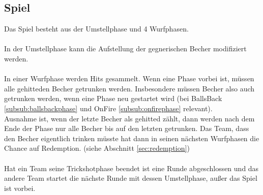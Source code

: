 \documentclass[a5paper, 12pt]{book}
\begin{document}
\subsection{Spiel}\label{sub:spiel}
Das Spiel besteht aus der Umstellphase und 4 Wurfphasen. \\\\
In der Umstellphase kann die Aufstellung der gegnerischen Becher modifiziert werden. \\\\
In einer Wurfphase werden Hits gesammelt. Wenn eine Phase vorbei ist, müssen alle gehitteden Becher getrunken werden. Insbesondere müssen Becher also auch getrunken werden, wenn eine Phase neu gestartet wird (bei BallsBack \ref{subsub:ballsbackphase} und OnFire \ref{subsub:onfirephase} relevant).\\
 Ausnahme ist, wenn der letzte Becher als gehitted zählt, dann werden nach dem Ende der Phase nur alle Becher bis auf den letzten getrunken. Das Team, dass den Becher eigentlich trinken müsste hat dann in seinen nächsten Wurfphasen die Chance auf Redemption. (siehe Abschnitt \ref{sec:redemption})\\\\
Hat ein Team seine Trickshotphase beendet ist eine Runde abgeschlossen und das andere Team startet die nächste Runde mit dessen Umstellphase, außer das Spiel ist vorbei.\\\\
\end{document}
